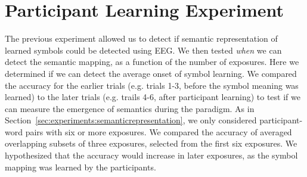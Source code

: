 \section{Participant Learning Experiment}
\label{sec:experiments:participantlearning}
The previous experiment allowed us to detect if semantic representation of learned symbols could be detected using EEG.  We then tested \emph{when} we can detect the semantic mapping, as a function of the number of exposures. Here we determined if we can detect the average onset of symbol learning. We compared the \tvt accuracy for the earlier trials (e.g. trials 1-3, before the symbol meaning was learned) to the later trials (e.g. trails 4-6, after participant learning) to test if we can measure the emergence of semantics during the paradigm. As in Section~\ref{sec:experiments:semanticrepresentation}, we only considered participant-word pairs with six or more exposures. We compared the \tvt accuracy of averaged overlapping subsets of three exposures, selected from the first six exposures. We hypothesized that the \tvt accuracy would increase in later exposures, as the symbol mapping was learned by the participants.
